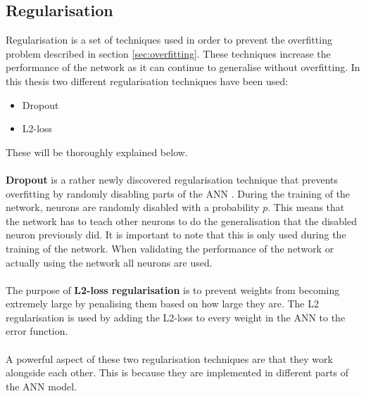 \subsection{Regularisation}\label{sec:regularisation}
Regularisation is a set of techniques used in order to prevent the overfitting problem described in section \ref{sec:overfitting}. These techniques increase the performance of the network as it can continue to generalise without overfitting. 
In this thesis two different regularisation techniques have been used:
\begin{itemize}
    \item Dropout
    \item L2-loss
\end{itemize}
These will be thoroughly explained below.
\\\\
\textbf{Dropout} is a rather newly discovered regularisation technique that prevents overfitting by randomly disabling parts of the ANN \parencite{srivastava2014dropout}. During the training of the network, neurons are randomly disabled with a probability $p$. This means that the network has to teach other neurons to do the generalisation that the disabled neuron previously did. It is important to note that this is only used during the training of the network. When validating the performance of the network or actually using the network all neurons are used.
\\\\
The purpose of \textbf{L2-loss regularisation} is to prevent weights from becoming extremely large by penalising them based on how large they are. The L2 regularisation is used by adding the L2-loss to every weight in the ANN to the error function.
\\\\

A powerful aspect of these two regularisation techniques are that they work alongside each other. This is because they are implemented in different parts of the ANN model.

